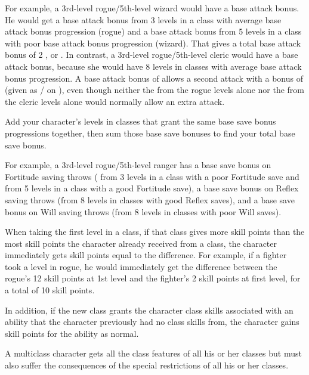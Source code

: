 \par For example, a 3rd-level rogue/5th-level wizard would have a  base attack bonus. He would get a  base attack bonus from 3 levels in a class with average base attack bonus progression (rogue) and a  base attack bonus from 5 levels in a class with poor base attack bonus progression (wizard). That gives a total base attack bonus of 2 , or . In contrast, a 3rd-level rogue/5th-level cleric would have a  base attack bonus, because she would have 8 levels in classes with average base attack bonus progression. A base attack bonus of  allows a second attack with a bonus of  (given as / on ), even though neither the  from the rogue levels alone nor the  from the cleric levels alone would normally allow an extra attack.

 Add your character's levels in classes that grant the same base save bonus progressions together, then sum those base save bonuses to find your total base save bonus.

\par For example, a 3rd-level rogue/5th-level ranger has a  base save bonus on Fortitude saving throws ( from 3 levels in a class with a poor Fortitude save and  from 5 levels in a class with a good Fortitude save), a  base save bonus on Reflex saving throws (from 8 levels in classes with good Reflex saves), and a  base save bonus on Will saving throws (from 8 levels in classes with poor Will saves).

 When taking the first level in a class, if that class gives more skill points than the most skill points the character already received from a class, the character immediately gets skill points equal to the difference. For example, if a fighter took a level in rogue, he would immediately get the difference between the rogue's 12 skill points at 1st level and the fighter's 2 skill points at first level, for a total of 10 skill points.

\par In addition, if the new class grants the character class skills associated with an ability that the character previously had no class skills from, the character gains skill points for the ability as normal.

 A multiclass character gets all the class features
of all his or her classes but must also suffer the consequences of the
special restrictions of all his or her classes.

